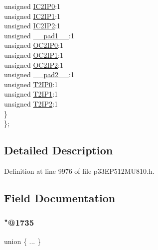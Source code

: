 \begin{DoxyCompactItemize}
\begin{tabbing}
\>\>unsigned \hyperlink{structtag_i_p_c1_b_i_t_s_a33db1ad1547f9e75a2a9907c26be6bbf}{IC2IP0}:1\\
\>\>unsigned \hyperlink{structtag_i_p_c1_b_i_t_s_ac68d138981264445c6d5e2f051ef56e5}{IC2IP1}:1\\
\>\>unsigned \hyperlink{structtag_i_p_c1_b_i_t_s_a06b0593f48f0af335e214d737b17ecbf}{IC2IP2}:1\\
\>\>unsigned \hyperlink{structtag_i_p_c1_b_i_t_s_acaf2d0924a107ec6e8d2e31febaf66f9}{\_\_pad1\_\_}:1\\
\>\>unsigned \hyperlink{structtag_i_p_c1_b_i_t_s_aaee23231bca6a005b39c08a5dba237a0}{OC2IP0}:1\\
\>\>unsigned \hyperlink{structtag_i_p_c1_b_i_t_s_a9dfb29c3a8803459d3b7f5540b7f25b0}{OC2IP1}:1\\
\>\>unsigned \hyperlink{structtag_i_p_c1_b_i_t_s_a246a5718552c51ef09a65634dc0084a5}{OC2IP2}:1\\
\>\>unsigned \hyperlink{structtag_i_p_c1_b_i_t_s_a4d97cc5f7d51d22fc2bf3eab35c9cb7f}{\_\_pad2\_\_}:1\\
\>\>unsigned \hyperlink{structtag_i_p_c1_b_i_t_s_aac064e545266503aceee0f5a2e1f6312}{T2IP0}:1\\
\>\>unsigned \hyperlink{structtag_i_p_c1_b_i_t_s_a94b658613b8619aa3c431fd6cca3a9a0}{T2IP1}:1\\
\>\>unsigned \hyperlink{structtag_i_p_c1_b_i_t_s_ae2d6448a9aed641feb94200b6b60b6f9}{T2IP2}:1\\
\>\} \\
\}; \\

\end{tabbing}\end{DoxyCompactItemize}


\subsection{Detailed Description}


Definition at line 9976 of file p33\+E\+P512\+M\+U810.\+h.



\subsection{Field Documentation}
\mbox{\label{structtag_i_p_c1_b_i_t_s_a35df3a46e8e530bb5fbd8f525f7e1473}} 
\subsubsection{\texorpdfstring{"@1735}{@1735}}
{\footnotesize\ttfamily union \{ ... \} }

